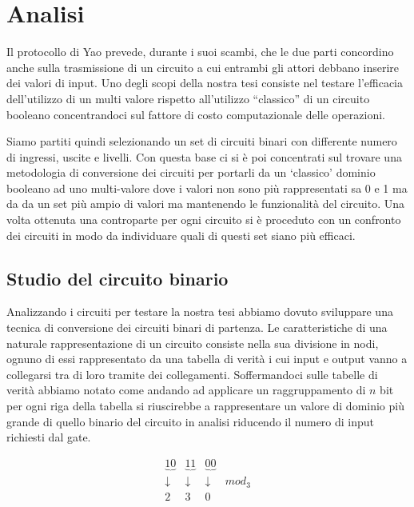 \documentclass[
  italian,
]{book}
\begin{document}
\hypertarget{analisi}{%
\chapter{Analisi}\label{analisi}}

Il protocollo di Yao prevede, durante i suoi scambi, che le due parti concordino anche sulla trasmissione di un circuito a cui entrambi gli attori debbano inserire dei valori di input. Uno degli scopi della nostra tesi consiste nel testare l'efficacia dell'utilizzo di un multi valore rispetto all'utilizzo ``classico'' di un circuito booleano concentrandoci sul fattore di costo computazionale delle operazioni.

Siamo partiti quindi selezionando un set di circuiti binari con differente numero di ingressi, uscite e livelli. Con questa base ci si è poi concentrati sul trovare una metodologia di conversione dei circuiti per portarli da un `classico' dominio booleano ad uno multi-valore dove i valori non sono più rappresentati sa 0 e 1 ma da da un set più ampio di valori ma mantenendo le funzionalità del circuito. Una volta ottenuta una controparte per ogni circuito si è proceduto con un confronto dei circuiti in modo da individuare quali di questi set siano più efficaci.

\newpage

\hypertarget{studio-del-circuito-binario}{%
\section{Studio del circuito binario}\label{studio-del-circuito-binario}}

Analizzando i circuiti per testare la nostra tesi abbiamo dovuto sviluppare una tecnica di conversione dei circuiti binari di partenza. Le caratteristiche di una naturale rappresentazione di un circuito consiste nella sua divisione in nodi, ognuno di essi rappresentato da una tabella di verità i cui input e output vanno a collegarsi tra di loro tramite dei collegamenti. Soffermandoci sulle tabelle di verità abbiamo notato come andando ad applicare un raggruppamento di \(n\) bit per ogni riga della tabella si riuscirebbe a rappresentare un valore di dominio più grande di quello binario del circuito in analisi riducendo il numero di input richiesti dal gate.

\[\begin{matrix}
    \underbrace{10} & \underbrace{11} & \underbrace{00} \\
    \downarrow & \downarrow & \downarrow  &mod_3 \\
    2 & 3 & 0
\end{matrix}\]
\end{document}
